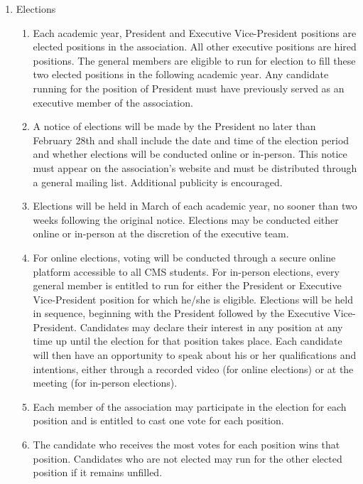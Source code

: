 \documentclass[12pt,a4paper]{article}
\begin{document}
\begin{enumerate}
\item Elections

\begin{enumerate}
\item Each academic year, President and Executive Vice-President positions are elected positions in the association. All other executive positions are hired positions. The general members are eligible to run for election to fill these two elected positions in the following academic year. Any candidate running for the position of President must have previously served as an executive member of the association.

\item A notice of elections will be made by the President no later than February 28th and shall include the date and time of the election period and whether elections will be conducted online or in-person. This notice must appear on the association's website and must be distributed through a general mailing list. Additional publicity is encouraged.

\item Elections will be held in March of each academic year, no sooner than two weeks following the original notice. Elections may be conducted either online or in-person at the discretion of the executive team.

\item For online elections, voting will be conducted through a secure online platform accessible to all CMS students. For in-person elections, every general member is entitled to run for either the President or Executive Vice-President position for which he/she is eligible. Elections will be held in sequence, beginning with the President followed by the Executive Vice-President. Candidates may declare their interest in any position at any time up until the election for that position takes place.
Each candidate will then have an opportunity to speak about his or her qualifications and intentions, either through a recorded video (for online elections) or at the meeting (for in-person elections).

\item Each member of the association may participate in the election for each position and is entitled to cast one vote for each position.

\item The candidate who receives the most votes for each position wins that position. Candidates who are not elected may run for the other elected position if it remains unfilled.


\end{enumerate}
\end{enumerate}
\end{document}
